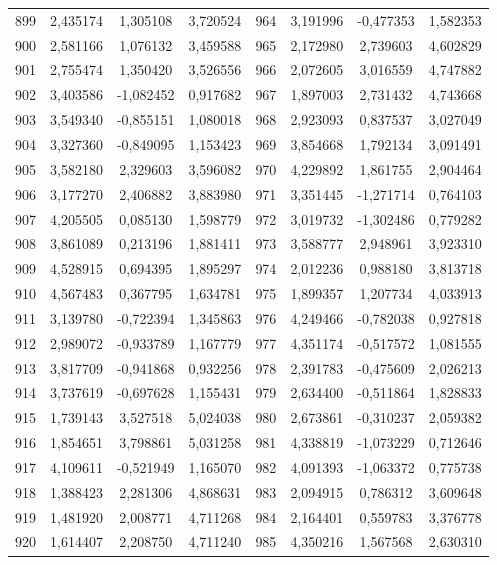 \begin{apendicesenv}
\begin{table}[H]
\begin{tabular}{c c c c c c c c}
		899 & 2,435174 & 1,305108 & 3,720524 & 964 & 3,191996 & -0,477353 & 1,582353 \\
		900 & 2,581166 & 1,076132 & 3,459588 & 965 & 2,172980 & 2,739603 & 4,602829 \\
		901 & 2,755474 & 1,350420 & 3,526556 & 966 & 2,072605 & 3,016559 & 4,747882 \\
		902 & 3,403586 & -1,082452 & 0,917682 & 967 & 1,897003 & 2,731432 & 4,743668 \\
		903 & 3,549340 & -0,855151 & 1,080018 & 968 & 2,923093 & 0,837537 & 3,027049 \\
		904 & 3,327360 & -0,849095 & 1,153423 & 969 & 3,854668 & 1,792134 & 3,091491 \\
		905 & 3,582180 & 2,329603 & 3,596082 & 970 & 4,229892 & 1,861755 & 2,904464 \\
		906 & 3,177270 & 2,406882 & 3,883980 & 971 & 3,351445 & -1,271714 & 0,764103 \\
		907 & 4,205505 & 0,085130 & 1,598779 & 972 & 3,019732 & -1,302486 & 0,779282 \\
		908 & 3,861089 & 0,213196 & 1,881411 & 973 & 3,588777 & 2,948961 & 3,923310 \\
		909 & 4,528915 & 0,694395 & 1,895297 & 974 & 2,012236 & 0,988180 & 3,813718 \\
		910 & 4,567483 & 0,367795 & 1,634781 & 975 & 1,899357 & 1,207734 & 4,033913 \\
		911 & 3,139780 & -0,722394 & 1,345863 & 976 & 4,249466 & -0,782038 & 0,927818 \\
		912 & 2,989072 & -0,933789 & 1,167779 & 977 & 4,351174 & -0,517572 & 1,081555 \\
		913 & 3,817709 & -0,941868 & 0,932256 & 978 & 2,391783 & -0,475609 & 2,026213 \\
		914 & 3,737619 & -0,697628 & 1,155431 & 979 & 2,634400 & -0,511864 & 1,828833 \\
		915 & 1,739143 & 3,527518 & 5,024038 & 980 & 2,673861 & -0,310237 & 2,059382 \\
		916 & 1,854651 & 3,798861 & 5,031258 & 981 & 4,338819 & -1,073229 & 0,712646 \\
		917 & 4,109611 & -0,521949 & 1,165070 & 982 & 4,091393 & -1,063372 & 0,775738 \\
		918 & 1,388423 & 2,281306 & 4,868631 & 983 & 2,094915 & 0,786312 & 3,609648 \\
		919 & 1,481920 & 2,008771 & 4,711268 & 984 & 2,164401 & 0,559783 & 3,376778 \\
		920 & 1,614407 & 2,208750 & 4,711240 & 985 & 4,350216 & 1,567568 & 2,630310 \\

\end{tabular}
\end{table}
\end{apendicesenv}
